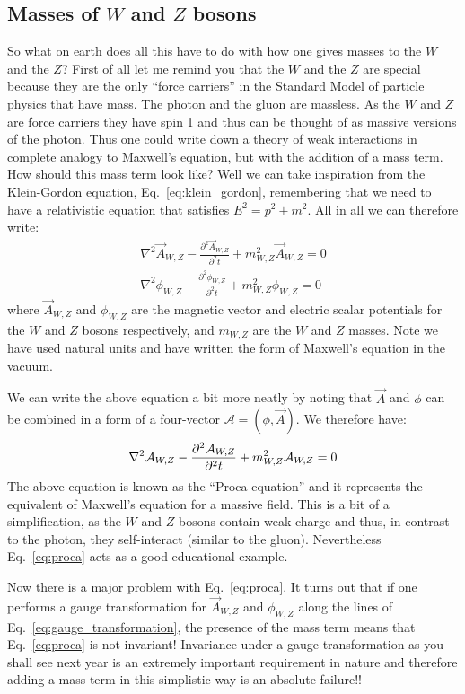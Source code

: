 \subsection{Masses of $W$ and $Z$ bosons}
So what on earth does all this have to do with how one gives masses to the $W$ and the $Z$? First of all let me remind you that the $W$ and the $Z$ are special because they are the only ``force carriers'' in the Standard Model of particle physics that have mass. The photon and the gluon are massless. As the $W$ and $Z$ are force carriers they have spin 1 and thus can be thought of as massive versions of the photon. Thus one could write down a theory of weak interactions in complete analogy to Maxwell's equation, but with the addition of a mass term. How should this mass term look like? Well we can take inspiration from the Klein-Gordon equation, Eq.~\ref{eq:klein_gordon}, remembering that we need to have a relativistic equation that satisfies $E^2=p^2+m^2$. All in all we can therefore write:
\begin{eqnarray}
\nabla^{2}\vec{A}_{W,Z}-\frac{\partial^2\vec{A}_{W,Z}}{\partial^2t}+m_{W,Z}^2\vec{A}_{W,Z}=0\\
\nabla^{2}\phi_{W,Z}-\frac{\partial^2\phi_{W,Z}}{\partial^2t}+m_{W,Z}^2 \phi_{W,Z}=0
\end{eqnarray}
where $\vec{A}_{W,Z}$ and $\phi_{W,Z}$ are the magnetic vector and electric scalar potentials for the $W$ and $Z$ bosons respectively, and $m_{W,Z}$ are the $W$ and $Z$ masses.
Note we have used natural units and have written the form of Maxwell's equation in the vacuum. 

We can write the above equation a bit more neatly by noting that $\vec{A}$ and $\phi$ can be combined in a form of a four-vector $\mathcal{A}=(\phi,\vec{A})$. We therefore have:
\begin{equation}
\label{eq:proca}
\nabla^{2}\mathcal{A}_{W,Z}-\frac{\partial^2\mathcal{A}_{W,Z}}{\partial^2t}+m_{W,Z}^2\mathcal{A}_{W,Z}=0\\
\end{equation}
The above equation is known as the ``Proca-equation'' and it represents the equivalent of Maxwell's equation for a massive field. This is a bit of a simplification, as the $W$ and $Z$ bosons contain weak charge and thus, in contrast to the photon, they self-interact (similar to the gluon). Nevertheless Eq.~\ref{eq:proca} acts as a good educational example.

Now there is a major problem with Eq.~\ref{eq:proca}. It turns out that if one performs a gauge transformation for $\vec{A}_{W,Z}$ and $\phi_{W,Z}$ along the lines of Eq.~\ref{eq:gauge_transformation}, the presence of the mass term means that Eq.~\ref{eq:proca} is not invariant! Invariance under a gauge transformation as you shall see next year is an extremely important requirement in nature and therefore adding a mass term
in this simplistic way is an absolute failure!!

